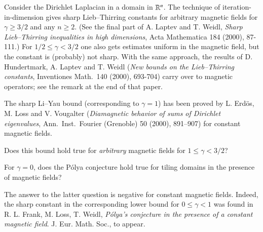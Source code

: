 \documentclass[12pt,letterpaper, reqno]{aimpl}
\begin{document}
\begin{problemblock} Consider the Dirichlet Laplacian in a domain
in $\mathbb R^n$. The technique of iteration-in-dimension gives sharp
Lieb--Thirring constants for arbitrary magnetic fields for $\gamma
\geq 3/2$ and any $n \geq 2$. (See the final part of A. Laptev and
T. Weidl, \emph{Sharp Lieb--Thirring inequalities in high
dimensions}, Acta Mathematica 184 (2000), 87-111.) For $1/2 \leq
\gamma < 3/2$ one also gets estimates uniform in the magnetic field,
but the constant is (probably) not sharp. With the same approach,
the results of D. Hundertmark, A. Laptev and T. Weidl (\emph{New
bounds on the Lieb--Thirring constants}, Inventiones Math.\ 140
(2000), 693-704) carry over to magnetic operators; see the remark at
the end of that paper.

The sharp Li--Yau bound (corresponding to $\gamma=1$) has been
proved by L. Erd\"{o}s, M. Loss and V. Vougalter (\emph{Diamagnetic
behavior of sums of Dirichlet eigenvalues}, Ann.\ Inst.\ Fourier
(Grenoble) 50 (2000), 891--907) for constant magnetic fields.

\begin{problem}[2.55]
 \label{it:blymag}
 Does
this bound hold true for \emph{arbitrary} magnetic fields for $1\leq\gamma<3/2$?
\end{problem}
\end{problemblock}

\begin{problemblock}
\begin{problem}[2.58]
For $\gamma=0$, does the P\'{o}lya conjecture hold true for tiling domains in the
presence of magnetic fields?
\end{problem}


\begin{remark}
 The answer to the latter question is negative for
constant magnetic fields. Indeed, the sharp constant in the corresponding
lower bound for $0\leq\gamma<1$ was found in R. L. Frank, M. Loss,
T. Weidl, \emph{P\'olya's conjecture in the presence of a constant
magnetic field}. J. Eur. Math. Soc., to appear.
\end{remark}

\end{problemblock}
\end{document}
